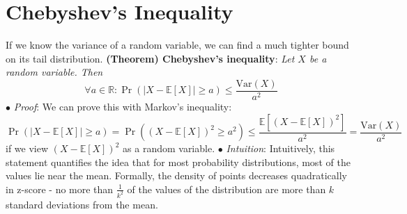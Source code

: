 \documentclass{article}
\newcommand*{\tb}{\textbf}
\newcommand*{\ti}{\textit}
\newcommand*{\n}{\newline}
\newcommand*{\nn}{\newline \newline}
\newcommand*{\Pf}{\indent \ensuremath{\bullet} \textit{Proof}: }
\newcommand*{\In}{\indent \ensuremath{\bullet} \textit{Intuition}: }
\newcommand*{\R}{\mathbb{R}}
\newcommand*{\E}{\mathbb{E}}
\begin{document}
\section{Chebyshev's Inequality}
If we know the variance of a random variable, we can find a much tighter bound on its tail distribution.
\nn
\tb{(Theorem) Chebyshev's inequality}: \ti{Let $ X $ be a random variable. Then}
$$ \forall a \in \R: \Pr(| X - \E[X] | \geq a) \leq \frac{\text{Var}(X)}{a^2} $$
\Pf We can prove this with Markov's inequality:
$$ \Pr(| X - \E[X] | \geq a) = \Pr((X - \E[X])^2 \geq a^2) \leq \frac{\E[(X - \E[X])^2]}{a^2} = \frac{\text{Var}(X)}{a^2} $$
if we view $ (X - \E[X])^2 $ as a random variable. \qedsymbol
\n
\In Intuitively, this statement quantifies the idea that for most probability distributions, most of the values lie near the mean. Formally, the density of points decreases quadratically in z-score - no more than $ \frac{1}{k^2} $ of the values of the distribution are more than $ k $ standard deviations from the mean.
\end{document}
